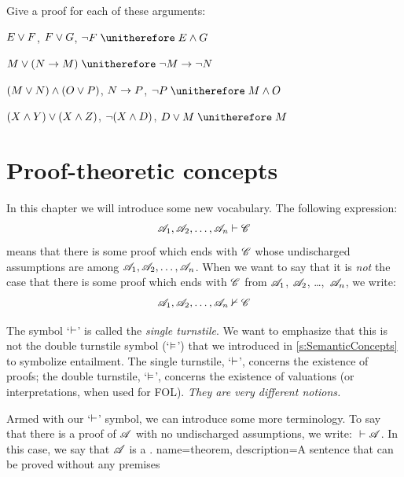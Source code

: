 \problempart 
Give a proof for each of these arguments:
\begin{compactlist}
\item $E\vee F$, $F\vee G$, $\enot F \therefore E \eand G$
\item $M\eor(N\eif M) \therefore \enot M \eif \enot N$
\item $(M \vee N) \wedge (O \vee P)$, $N \rightarrow P$, $\enot P \therefore M\eand O$
\item $(X\wedge Y)\vee(X\wedge Z)$, $\neg(X\wedge D)$, $D\eor M \therefore M$
\end{compactlist}



\chapter{Proof-theoretic concepts}\label{s:ProofTheoreticConcepts}

In this chapter we will introduce some new vocabulary. The following expression:
$$\mathscr{A}_1, \mathscr{A}_2, \ldots, \mathscr{A}_n \vdash \mathscr{C}$$
means that there is some proof which ends with $\mathscr{C}$ whose undischarged assumptions are among $\mathscr{A}_1, \mathscr{A}_2, \ldots, \mathscr{A}_n$. When we want to say that it is \emph{not} the case that there is some proof which ends with $\mathscr{C}$ from $\mathscr{A}_1$, $\mathscr{A}_2$, \dots,~$\mathscr{A}_n$, we write:  $$\mathscr{A}_1, \mathscr{A}_2, \ldots, \mathscr{A}_n \nvdash \mathscr{C}$$ 

The symbol `$\vdash$' is called the \emph{single turnstile}. We want to emphasize that this is not the {double turnstile} symbol (`$\vDash$') that we introduced in \cref{s:SemanticConcepts} to symbolize entailment. The single turnstile, `$\vdash$', concerns the existence of proofs; the double turnstile, `$\vDash$', concerns the existence of valuations (or interpretations, when used for FOL). \emph{They are very different notions.}

Armed with our `$\vdash$' symbol, we can introduce some more terminology. To say that there is a proof of $\mathscr{A}$ with no undischarged assumptions, we write: ${} \vdash \mathscr{A}$. In this case, we say that $\mathscr{A}$ is a .
{
name=theorem,
description={A sentence that can be proved without any premises}
}

